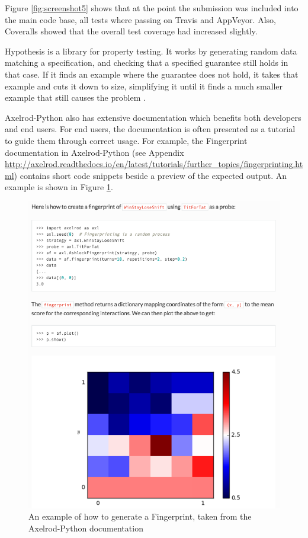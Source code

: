 Figure \ref{fig:screenshot5} shows that at the point the submission was included into the main code base, all tests where passing on Travis and AppVeyor.
Also, Coveralls showed that the overall test coverage had increased slightly.

Hypothesis \cite{Hypothesis3.6.1} is a library for property testing.
It works by generating random data matching a specification, and checking that a specified guarantee still holds in that case.
If it finds an example where the guarantee does not hold, it takes that example and cuts it down to size, simplifying it until it finds a much smaller example that still causes the problem \cite{HypothesisDocs}.

Axelrod-Python also has extensive documentation \cite{axelroddocs} which benefits both developers and end users.
For end users, the documentation is often presented as a tutorial to guide them through correct usage.
For example, the Fingerprint documentation in Axelrod-Python (see Appendix \url{http://axelrod.readthedocs.io/en/latest/tutorials/further_topics/fingerprinting.html}) contains short code snippets beside a preview of the expected output.
An example is shown in Figure \ref{fig:screenshot-documentation}.

\begin{figure}[htbp!]
\includegraphics[width = \textwidth]{../img/screenshots/Documentation.png}
\caption{An example of how to generate a Fingerprint, taken from the Axelrod-Python documentation}
\label{fig:screenshot-documentation}
\end{figure}


